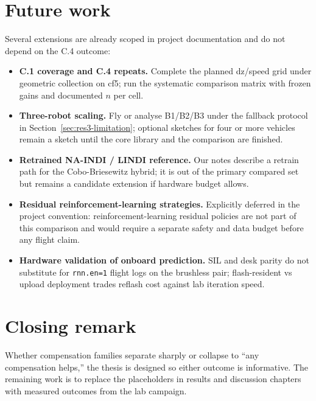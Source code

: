 \section{Future work}
\label{sec:conclusion-future}

Several extensions are already scoped in project documentation and do not depend on the C.4 outcome:

\begin{itemize}
  \item \textbf{C.1 coverage and C.4 repeats.} Complete the planned dz/speed grid under geometric
    collection on cf5; run the systematic comparison matrix with frozen gains and documented $n$
    per cell.
  \item \textbf{Three-robot scaling.} Fly or analyse B1/B2/B3 under the fallback protocol in
    Section~\ref{sec:res3-limitation}; optional sketches for four or more vehicles remain
    a sketch until the core library and the comparison are finished.
  \item \textbf{Retrained NA-INDI / LINDI reference.} Our notes describe
    a retrain path for the Cobo-Briesewitz hybrid; it is out of the primary compared set but remains
    a candidate extension if hardware budget allows.
  \item \textbf{Residual reinforcement-learning strategies.} Explicitly deferred in the project convention:
    reinforcement-learning residual policies are not part of this comparison and would require a
    separate safety and data budget before any flight claim.
  \item \textbf{Hardware validation of onboard prediction.} SIL and desk parity do not substitute for
    \texttt{rnn.en=1} flight logs on the brushless pair; flash-resident vs upload deployment trades
    reflash cost against lab iteration speed.
\end{itemize}

\section{Closing remark}
\label{sec:conclusion-close}

Whether compensation families separate sharply or collapse to ``any compensation helps,'' the thesis
is designed so either outcome is informative. The remaining work is to replace the placeholders in
results and discussion chapters with measured outcomes from the lab campaign.
